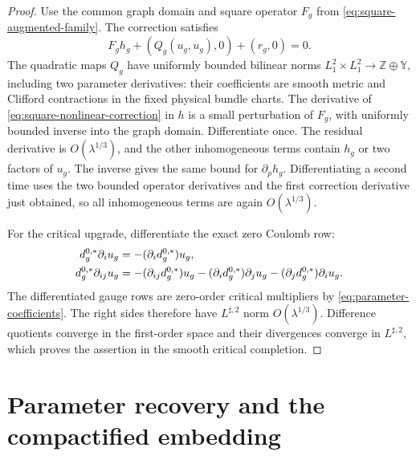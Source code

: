 \documentclass[11pt]{amsart}
\theoremstyle{definition}
\theoremstyle{remark}
\theoremstyle{plain}
\begin{document}
\begin{proof}
Use the common graph domain and square operator $F_g$ from
\eqref{eq:square-augmented-family}.  The correction satisfies
\begin{equation}\label{eq:square-nonlinear-correction}
 F_gh_g+(Q_g(u_g,u_g),0)+(r_g,0)=0.
\end{equation}
The quadratic maps $Q_g$ have uniformly bounded bilinear norms
$L^2_1\times L^2_1\to\mathbb Z\oplus\mathbb Y$, including two parameter
derivatives: their coefficients are smooth metric and Clifford
contractions in the fixed physical bundle charts.  The derivative of
\eqref{eq:square-nonlinear-correction} in $h$ is a small perturbation
of $F_g$, with uniformly bounded inverse into the graph domain.
Differentiate once.  The residual derivative is $O(\lambda^{1/3})$,
and the other inhomogeneous terms contain $h_g$ or two factors of $u_g$.
The inverse gives the same bound for $\partial_p h_g$.
Differentiating a second time uses the two bounded operator derivatives
and the first correction derivative just obtained, so all inhomogeneous
terms are again $O(\lambda^{1/3})$.

For the critical upgrade, differentiate the exact zero Coulomb row:
\begin{align}\label{eq:correction-critical-divergences}
 d_g^{0,*}\partial_i u_g
 &=-(\partial_i d_g^{0,*})u_g,\notag\\
 d_g^{0,*}\partial_{ij}u_g
 &=-(\partial_{ij}d_g^{0,*})u_g
  -(\partial_i d_g^{0,*})\partial_j u_g
  -(\partial_j d_g^{0,*})\partial_i u_g.
\end{align}
The differentiated gauge rows are zero-order critical multipliers by
\eqref{eq:parameter-coefficients}.  The right sides therefore have
$L^{\sharp,2}$ norm $O(\lambda^{1/3})$.
Difference quotients converge in the first-order space and their
divergences converge in $L^{\sharp,2}$, which proves the assertion in
the smooth critical completion.
\end{proof}

\section{Parameter recovery and the compactified embedding}
\label{sec:embedding}
\end{document}
